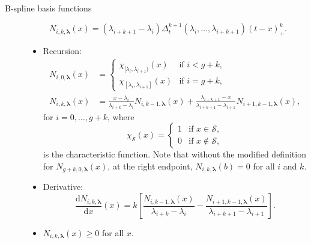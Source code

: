 \documentclass{article}
\renewcommand{\vec}[1]{\bm{#1}}
\newcommand{\md}{\mathrm{d}}
\begin{document}
\begin{description}
\begin{itemize}
  \end{itemize}

\item[B-spline basis functions]
  \begin{equation}
    N_{i, k, \vec{\lambda}}(x) = (\lambda_{i+k+1} - \lambda_i)
    \Delta_t^{k+1}(\lambda_i, \ldots, \lambda_{i+k+1}) (t - x)_{+}^k.
  \end{equation}

  \begin{itemize}

  \item Recursion:
    \begin{equation}
      \begin{split}
        N_{i, 0, \vec{\lambda}}(x)
        &=
        \begin{cases}
          \chi_{[\lambda_i, \lambda_{i+1})}(x)
          & \text{if $i < g + k$},
          \\
          \chi_{[\lambda_i, \lambda_{i+1}]}(x)
          & \text{if $i = g + k$},
        \end{cases}
        \\
        N_{i, k, \vec{\lambda}}(x)
        &=
        \frac{x - \lambda_i}{\lambda_{i+k} - \lambda_i}
        N_{i, k-1, \vec{\lambda}}(x)
        + \frac{\lambda_{i+k+1} - x}{\lambda_{i+k+1} - \lambda_{i+1}}
        N_{i+1, k-1, \vec{\lambda}}(x),
      \end{split}
    \end{equation}
    for $i = 0, \ldots, g+k$, where
    \begin{equation}
      \label{eq:3}
      \chi_{\mathcal{S}}(x)
      =
      \begin{cases}
        1 & \text{if $x \in \mathcal{S}$},
        \\
        0 & \text{if $x \notin \mathcal{S}$},
      \end{cases}
    \end{equation}
    is the characteristic function.
    Note that without the modified definition for
    $N_{g + k, 0, \vec{\lambda}}(x)$,
    at the right endpoint,
    $N_{i, k, \vec{\lambda}}(b) = 0$ for all $i$ and $k$.

  \item Derivative:
    \begin{equation}
      \frac{\md N_{i, k, \vec{\lambda}}}{\md x}(x)
      =
      k \left[
        \frac{N_{i, k-1, \vec{\lambda}}(x)}
        {\lambda_{i+k} - \lambda_i}
        - \frac{N_{i+1, k-1, \vec{\lambda}}(x)}
        {\lambda_{i+k+1} - \lambda_{i+1}}
      \right].
    \end{equation}

  \item $N_{i, k, \vec{\lambda}}(x) \geq 0$
    for all $x$.

  \end{itemize}

\end{description}
\end{document}
